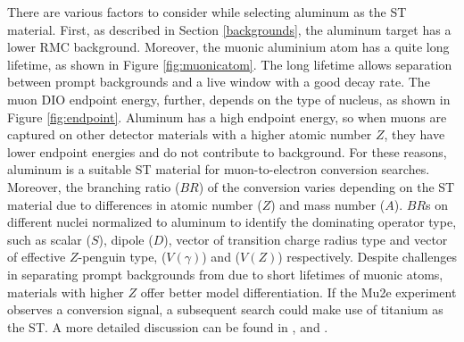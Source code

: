 There are various factors to consider while selecting aluminum as the ST material. 
First, as described in Section \ref{backgrounds}, the aluminum 
target has a lower RMC background. Moreover, the muonic aluminium 
atom has a quite long lifetime, as shown in Figure \ref{fig:muonicatom}. 
The long lifetime allows separation between prompt backgrounds and a 
live window with a good decay rate. The muon DIO endpoint energy, 
further, depends on the type of nucleus, as shown in Figure \ref{fig:endpoint}. 
Aluminum has a high endpoint energy, so when muons are captured on other 
detector materials with a higher atomic number $Z$, they have lower 
endpoint energies and do not contribute to background. For these reasons, aluminum is a 
suitable ST material for muon-to-electron conversion searches.
Moreover, the branching ratio ($BR$) of the conversion varies 
depending on the ST material due to differences in atomic number 
($Z$) and mass number ($A$).  $BR$s on different nuclei 
normalized to aluminum to identify the dominating 
operator type, such as scalar ($S$), dipole ($D$), vector of 
transition charge radius type and vector of effective $Z$-penguin type, 
($V(\gamma)$) and ($V(Z)$) respectively. 
Despite challenges in separating prompt backgrounds from 
 due to short lifetimes of muonic atoms, 
materials with higher $Z$ offer better model differentiation. 
If the Mu2e experiment observes a conversion signal, a subsequent search 
could make use of titanium as the ST. A more detailed discussion can be 
found in \cite{PhysRevD.80.013002}, \cite{PhysRevD.76.059902} and 
\cite{abusalma2018expression}.


